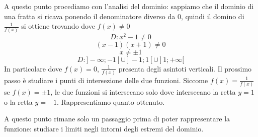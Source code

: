 \documentclass{article}     %
\begin{document}
        A questo punto procediamo con l'analisi del dominio: sappiamo che il dominio di una fratta si ricava ponendo il denominatore diverso da $0$, quindi il domino di $\frac{1}{f(x)}$ si ottiene trovando dove $f(x)\neq0$
        \[D: x^2-1\neq 0\]
        \[(x-1)(x+1)\neq 0\]
        \[x\neq \pm 1\]
        \[D: ]-\infty;-1[\cup]-1;1[\cup]1;+\infty[\]
        In particolare dove $f(x)=0$, $\frac{1}{f(x)}$ presenta degli asintoti verticali. Il prossimo passo è studiare i punti di intersezione delle due funzioni. Siccome $f(x)=\frac{1}{f(x)}$ se $f(x)=\pm 1$, le due funzioni si intersecano solo dove intersecano la retta $y=1$ o la retta $y=-1$. Rappresentiamo quanto ottenuto.
        \begin{figure}[ht]
            \centering
        \end{figure}
        A questo punto rimane solo un passaggio prima di poter rappresentare la funzione: studiare i limiti negli intorni degli estremi del dominio. 
\end{document}
